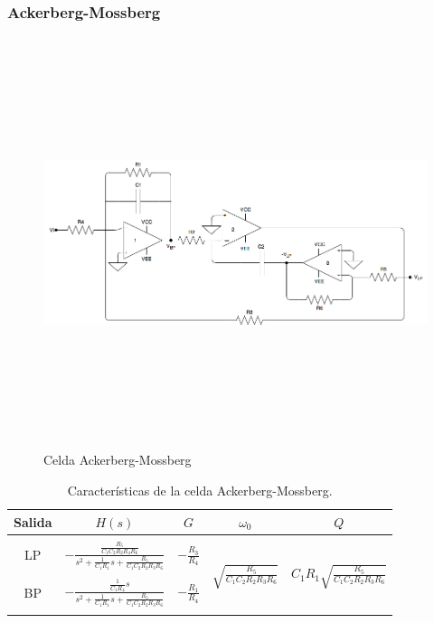 \subsubsection{Ackerberg-Mossberg}

\begin{figure}[H] %
	\centering
	\includegraphics[width=12cm,height=12cm,keepaspectratio]{../EJ4/imagenes/ACKBERG.png}
	\caption{Celda Ackerberg-Mossberg}
	\label{ackerberg}
\end{figure}

\begin{table}[h!] %
	\centering
	\begin{tabular}{c c c c c}
		Salida & $H(s)$ & $G$ & $\omega_0$ & $Q$\\
		\hline \\
		LP & $- \frac{\frac{R_5}{C_1C_2R_2R_4R_6}}{s^2+\frac{1}{C_1R_1}s+\frac{R_5}{C_1C_2R_2R_3R_6}}$& $-\frac{R_3}{R_4}$& \multirow{4}{*}{$\sqrt{\frac{R_5}{C_1C_2R_2R_3R_6}}$}&
		\multirow{4}{*}{$C_1R_1\sqrt{\frac{R_5}{C_1C_2R_2R_3R_6}}$}\\ \\
		BP & $-\frac{\frac{1}{C_1R_4}s}{s^2+\frac{1}{C_1R_1}s + \frac{R_5}{C_1C_2R_2R_3R_6}}$&$-\frac{R_1}{R_4}$& &\\ \\
		\hline
	\end{tabular}
	\caption{Caracter\'isticas de la celda Ackerberg-Mossberg.}
	\label{am_tt}
\end{table}

